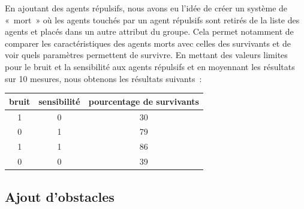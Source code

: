 \documentclass[french, a4paper, 12pt, openany]{report}
\begin{document}
		En ajoutant des agents répulsifs, nous avons eu l'idée de créer un système de «~mort~» où les agents touchés par un agent répulsifs sont retirés de la liste des agents et placés dans un autre attribut du groupe. Cela permet notamment de comparer les caractéristiques des agents morts avec celles des survivants et de voir quels paramètres permettent de survivre. En mettant des valeurs limites pour le bruit et la sensibilité aux agents répulsifs et en moyennant les résultats sur 10 mesures, nous obtenons les résultats suivants~:
		
		\begin{tabular}{|c|c|c|} \hline
		\centering
			bruit & sensibilité & pourcentage de survivants \\ \hline
			1 & 0 & 30 \\ \hline
			0 & 1 & 79 \\ \hline
			1 & 1 & 86 \\ \hline
			0 & 0 & 39 \\ \hline
		\end{tabular}

\subsection{Ajout d'obstacles}
	
\end{document}
